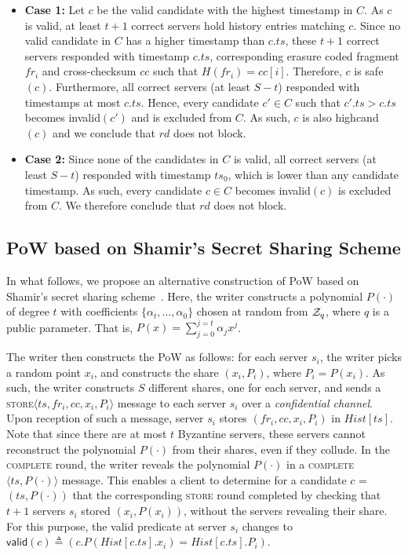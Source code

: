 \documentclass[10pt,conference,compsocconf]{IEEEtran}
\newcommand{\complete}{\textsc{complete}}
\begin{document}
\begin{itemize}
\item \textbf{Case 1:} Let $c$ be the valid candidate with the highest timestamp in $C$. As $c$ is valid, at least $t+1$ correct servers hold history entries matching $c$. Since no valid candidate in $C$ has a higher timestamp than $c.ts$, these $t+1$ correct servers responded with timestamp $c.ts$, corresponding erasure coded fragment $fr_i$ and cross-checksum $cc$ such that $H(fr_i) = cc[i]$. Therefore, $c$ is \textsf{safe}$(c)$. Furthermore, all correct servers (at least $S-t$) responded with timestamps at most $c.ts$. Hence, every candidate $c' \in C$ such that $c'.ts > c.ts$ becomes \textsf{invalid}$(c')$  and is excluded from $C$. As such, $c$ is also \textsf{highcand}$(c)$ and we conclude that $rd$ does not block.
\item \textbf{Case 2:} Since none of the candidates in $C$ is valid, all correct servers (at least $S-t$) responded with timestamp $ts_0$, which is lower than any candidate timestamp. As such,  every candidate $c \in C$  becomes \textsf{invalid}$(c)$ is excluded from $C$. We therefore conclude that $rd$ does not block.
\end{itemize}



\subsection{PoW based on Shamir's Secret Sharing Scheme}\label{subsec:shamir}

In what follows, we propose an alternative construction of PoW based on Shamir's secret sharing scheme~\cite{Sha79}.
Here, the writer constructs a polynomial $P(\cdot)$ of degree $t$ with coefficients $\{\alpha_{t}, \dots, \alpha_{0}\}$ chosen at random from ${\cal Z}_{q}$, where $q$ is a public parameter. That is,
$P(x) = \sum_{j=0}^{j=t} \alpha_j x^j$.

The writer then constructs the PoW as follows: for each server $s_i$, the writer picks a random point $x_i$, and constructs the share $(x_{i}, P_i)$, where $P_i = P(x_i)$. As such, the writer constructs $S$ different shares, one for each server, and sends a \textsc{store}$\langle ts, fr_i, cc, x_{i}, P_i \rangle$ message to each server $s_i$ over a \emph{confidential channel}.
Upon reception of such a message, server $s_i$ stores $(fr_i, cc, x_i, P_i)$ in $Hist[ts]$. Note that since there are at most $t$ Byzantine servers, these servers cannot reconstruct the polynomial $P(\cdot)$ from their shares, even if they collude. In the \textsc{\complete} round, the writer reveals the polynomial $P(\cdot)$ in a \textsc{\complete}$\langle ts, P(\cdot) \rangle$ message. This enables a client to determine for a candidate $c$ = $(ts, P(\cdot))$ that the corresponding \textsc{store} round completed by checking that $t+1$ servers $s_i$ stored $(x_{i}, P(x_{i}))$, without the servers revealing their share. For this purpose, the \textsf{valid} predicate at server $s_i$ changes to $\textsf{valid}(c) \triangleq (c.P(Hist[c.ts].x_i) = Hist[c.ts].P_i)$.
\end{document}
